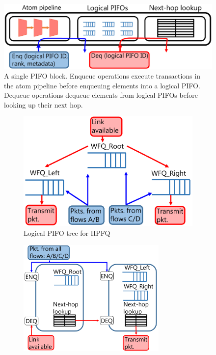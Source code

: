 \begin{figure}[!t]
  \centering
  \includegraphics[width=0.6\columnwidth]{pifo_pifo_block.pdf}
  \caption{A single PIFO block. Enqueue operations execute transactions in the atom pipeline
  before enqueuing elements into a logical PIFO. Dequeue operations dequeue elements from logical PIFOs
  before looking up their next hop.} 
  \label{fig:block}
\end{figure}

\begin{figure}[!t]
  \begin{subfigure}[b]{0.5\textwidth}
  \begin{center}
  \includegraphics[width=\textwidth]{pifo_hpfq_logical.pdf}
  \caption{Logical PIFO tree for HPFQ}
  \label{fig:hpfq_path}
  \end{center}
  \end{subfigure}
  \begin{subfigure}[b]{0.5\textwidth}
  \begin{center}
  \includegraphics[width=0.8\textwidth]{pifo_hpfq_physical.pdf}

\end{center}
\end{subfigure}
\end{figure}
